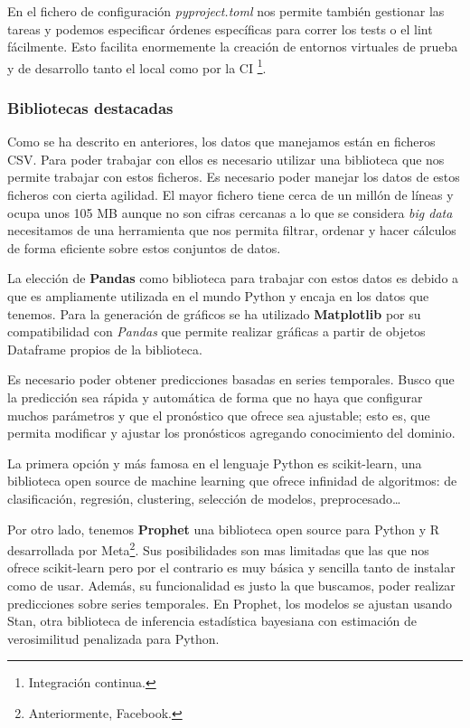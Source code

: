 En el fichero de configuración \textit{pyproject.toml} nos permite también gestionar las
tareas y podemos especificar órdenes específicas para correr los tests o el lint
fácilmente. Esto facilita enormemente la creación de entornos virtuales de prueba y de
desarrollo tanto el local como por la CI \footnote{Integración continua.}.


\subsubsection{Bibliotecas destacadas}
Como se ha descrito en anteriores, los datos que manejamos están en ficheros CSV. Para
poder trabajar con ellos es necesario utilizar una biblioteca que nos permite trabajar con
estos ficheros. Es necesario poder manejar los datos de estos ficheros con cierta
agilidad. El mayor fichero tiene cerca de un millón de líneas y ocupa unos 105 MB aunque no son cifras
cercanas a lo que se considera \textit{big data} necesitamos de una herramienta que nos
permita filtrar, ordenar y hacer cálculos de forma eficiente sobre estos conjuntos de datos.

La elección de \textbf{Pandas} como biblioteca para trabajar con estos datos es debido a
que es ampliamente utilizada en el mundo Python y encaja en los datos que tenemos. Para la
generación de gráficos se ha utilizado \textbf{Matplotlib}  por su compatibilidad con
\textit{Pandas} que permite realizar gráficas a partir de objetos Dataframe propios de la
biblioteca.

\vskip 0.2in

Es necesario poder obtener predicciones basadas en series temporales. Busco que la
predicción sea rápida y automática de forma que no haya que configurar muchos parámetros y
que el pronóstico que ofrece sea ajustable; esto es, que permita modificar y ajustar los
pronósticos agregando conocimiento del dominio.

La primera opción y más famosa en el lenguaje Python es scikit-learn, una biblioteca open
source de machine learning que ofrece infinidad de algoritmos: de clasificación,
regresión, clustering, selección de modelos, preprocesado\ldots

Por otro lado, tenemos \textbf{Prophet} una biblioteca open source para Python y R
desarrollada por Meta\footnote{Anteriormente, Facebook.}. Sus posibilidades son mas
limitadas que las que nos ofrece scikit-learn pero por el contrario es muy básica y
sencilla tanto de instalar como de usar. Además, su funcionalidad es justo la que
buscamos, poder realizar predicciones sobre series temporales. En Prophet, los modelos se
ajustan usando Stan, otra biblioteca de inferencia estadística bayesiana con estimación de
verosimilitud penalizada para Python.

